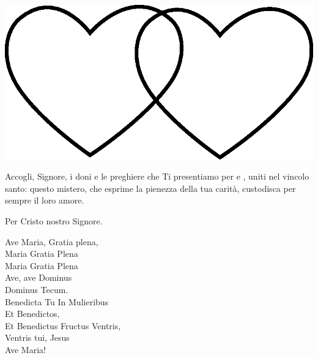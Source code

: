 \documentclass[11pt]{book}
\begin{document}
\consegnanello
\linebreak
\begin{center}
\includegraphics[scale=0.1]{img/cuori_venn.eps}
\end{center}
\vfill
\pagebreak

\introfedeli
\preghierefedeli
\vfill
\pagebreak


Accogli, Signore, i doni e le preghiere che Ti presentiamo
per \sposa{} e \sposo, uniti nel vincolo
santo: questo mistero, che esprime la pienezza della
tua carità, custodisca per sempre il loro amore. \par\nobreak
Per Cristo nostro Signore.

\settowidth{\versewidth}{Et Benedictus Fructus Ventris,}
\begin{canzone}%
Ave Maria, Gratia plena,\\
Maria Gratia Plena\\
Maria Gratia Plena\\
Ave, ave Dominus\\
Dominus Tecum.\\
Benedicta Tu In Mulieribus\\
Et Benedictos,\\
Et Benedictus Fructus Ventris,\\
Ventris tui, Jesus\\
Ave Maria!\\
\end{canzone}
\end{document}
